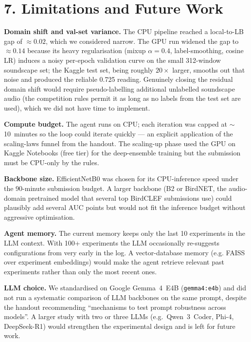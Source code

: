 \documentclass[11pt,a4paper]{article}
\begin{document}
\section*{7. Limitations and Future Work}

\textbf{Domain shift and val-set variance.} The CPU pipeline reached a local-to-LB gap of $\approx 0.02$, which we considered narrow. The GPU run widened the gap to $\approx 0.14$ because its heavy regularisation (mixup $\alpha=0.4$, label-smoothing, cosine LR) induces a noisy per-epoch validation curve on the small 312-window soundscape set; the Kaggle test set, being roughly $20\times$ larger, smooths out that noise and produced the reliable 0.725 reading. Genuinely closing the residual domain shift would require pseudo-labelling additional unlabelled soundscape audio (the competition rules permit it as long as no labels from the test set are used), which we did not have time to implement.

\textbf{Compute budget.} The agent runs on CPU; each iteration was capped at $\sim$10~minutes so the loop could iterate quickly --- an explicit application of the scaling-laws funnel from the handout. The scaling-up phase used the GPU on Kaggle Notebooks (free tier) for the deep-ensemble training but the submission must be CPU-only by the rules.

\textbf{Backbone size.} EfficientNetB0 was chosen for its CPU-inference speed under the 90-minute submission budget. A larger backbone (B2 or BirdNET, the audio-domain pretrained model that several top BirdCLEF submissions use) could plausibly add several AUC points but would not fit the inference budget without aggressive optimisation.

\textbf{Agent memory.} The current memory keeps only the last 10 experiments in the LLM context. With 100+ experiments the LLM occasionally re-suggests configurations from very early in the log. A vector-database memory (e.g. FAISS over experiment embeddings) would make the agent retrieve relevant past experiments rather than only the most recent ones.

\textbf{LLM choice.} We standardised on Google Gemma~4~E4B (\texttt{gemma4:e4b}) and did not run a systematic comparison of LLM backbones on the same prompt, despite the handout recommending ``mechanisms to test prompt robustness across models''. A larger study with two or three LLMs (e.g.\ Qwen~3~Coder, Phi-4, DeepSeek-R1) would strengthen the experimental design and is left for future work.
\end{document}
